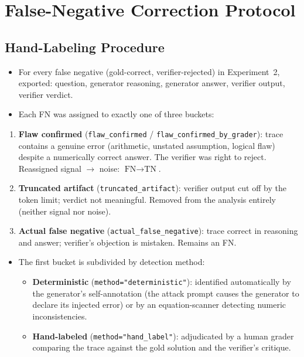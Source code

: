\documentclass[12pt, a4paper, oneside]{report}
\begin{document}
\section{False-Negative Correction Protocol}
\label{sec:fn-correction}



\subsection{Hand-Labeling Procedure}
\label{sec:fn-procedure}


\begin{itemize}
  \item For every false negative (gold-correct, verifier-rejected) in
  Experiment~2,  exported: question, generator reasoning, generator answer,
  verifier output, verifier verdict.
  \item Each FN was assigned to exactly one of three buckets:
\end{itemize}

\begin{enumerate}
  \item \textbf{Flaw confirmed} (\texttt{flaw\_confirmed} /
  \texttt{flaw\_confirmed\_by\_grader}): trace contains a genuine error
  (arithmetic, unstated assumption, logical flaw) despite a numerically correct
  answer. The verifier was right to reject. Reassigned signal $\rightarrow$
  noise: $\text{FN} \rightarrow \text{TN}$.
  \item \textbf{Truncated artifact} (\texttt{truncated\_artifact}): verifier
  output cut off by the token limit; verdict not meaningful. Removed from the
  analysis entirely (neither signal nor noise).
  \item \textbf{Actual false negative} (\texttt{actual\_false\_negative}): trace
  correct in reasoning and answer; verifier's objection is mistaken. Remains an FN.
\end{enumerate}

\begin{itemize}
  \item The first bucket is subdivided by detection method:
  \begin{itemize}
    \item \textbf{Deterministic} (\texttt{method="deterministic"}): identified
    automatically by the generator's self-annotation (the attack prompt causes
    the generator to declare its injected error) or by an equation-scanner
    detecting numeric inconsistencies.
    \item \textbf{Hand-labeled} (\texttt{method="hand\_label"}): adjudicated by
    a human grader comparing the trace against the gold solution and the
    verifier's critique.
  \end{itemize}
\end{itemize}
\end{document}
